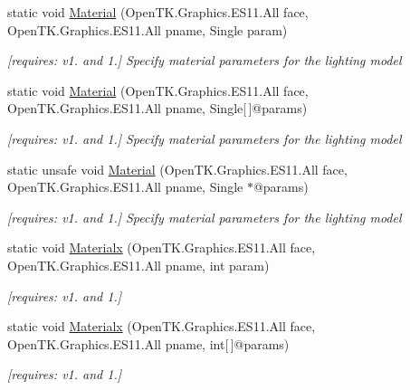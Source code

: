 \begin{DoxyCompactItemize}
static void \hyperlink{class_open_t_k_1_1_graphics_1_1_e_s11_1_1_g_l_a301a7a542aca655b3ba70502a0689be3}{Material} (Open\-T\-K.\-Graphics.\-E\-S11.\-All face, Open\-T\-K.\-Graphics.\-E\-S11.\-All pname, Single param)
\begin{DoxyCompactList}\small\item\em \mbox{[}requires\-: v1. and 1.\mbox{]} Specify material parameters for the lighting model \end{DoxyCompactList}\item 
static void \hyperlink{class_open_t_k_1_1_graphics_1_1_e_s11_1_1_g_l_aae0957cda43264471867f19c60a0a965}{Material} (Open\-T\-K.\-Graphics.\-E\-S11.\-All face, Open\-T\-K.\-Graphics.\-E\-S11.\-All pname, Single\mbox{[}$\,$\mbox{]}@params)
\begin{DoxyCompactList}\small\item\em \mbox{[}requires\-: v1. and 1.\mbox{]} Specify material parameters for the lighting model \end{DoxyCompactList}\item 
static unsafe void \hyperlink{class_open_t_k_1_1_graphics_1_1_e_s11_1_1_g_l_a4b4c972c565eb7e5426cddd9c80908ee}{Material} (Open\-T\-K.\-Graphics.\-E\-S11.\-All face, Open\-T\-K.\-Graphics.\-E\-S11.\-All pname, Single $\ast$@params)
\begin{DoxyCompactList}\small\item\em \mbox{[}requires\-: v1. and 1.\mbox{]} Specify material parameters for the lighting model \end{DoxyCompactList}\item 
static void \hyperlink{class_open_t_k_1_1_graphics_1_1_e_s11_1_1_g_l_a8b7b7adf7c866b239f0b2b5eb3d37611}{Materialx} (Open\-T\-K.\-Graphics.\-E\-S11.\-All face, Open\-T\-K.\-Graphics.\-E\-S11.\-All pname, int param)
\begin{DoxyCompactList}\small\item\em \mbox{[}requires\-: v1. and 1.\mbox{]}\end{DoxyCompactList}\item 
static void \hyperlink{class_open_t_k_1_1_graphics_1_1_e_s11_1_1_g_l_a0bd44d6a1f447d56e11a7145595fe478}{Materialx} (Open\-T\-K.\-Graphics.\-E\-S11.\-All face, Open\-T\-K.\-Graphics.\-E\-S11.\-All pname, int\mbox{[}$\,$\mbox{]}@params)
\begin{DoxyCompactList}\small\item\em \mbox{[}requires\-: v1. and 1.\mbox{]}\end{DoxyCompactList}\item 

\end{DoxyCompactItemize}
